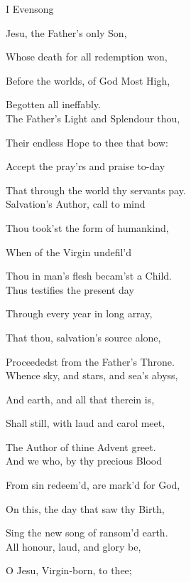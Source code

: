
\begin{paracol}{2}[]
\sloppy
\begin{inhead}
	I Evensong
\end{inhead}
\begin{hangparas}{1.25em}{1}
	
Jesu, the Father's only Son,

Whose death for all redemption won,

Before the worlds, of God Most High,

Begotten all ineffably.\\

The Father's Light and Splendour thou,

Their endless Hope to thee that bow:

Accept the pray'rs and praise to-day

That through the world thy servants pay.\\

Salvation's Author, call to mind

Thou took'st the form of humankind,

When of the Virgin undefil'd

Thou in man's flesh becam'st a Child.\\

Thus testifies the present day

Through every year in long array,

That thou, salvation's source alone,

Proceededst from the Father's Throne.\\

Whence sky, and stars, and sea's abyss,

And earth, and all that therein is,

Shall still, with laud and carol meet,

The Author of thine Advent greet.\\

And we who, by thy precious Blood

From sin redeem'd, are mark'd for God,

On this, the day that saw thy Birth,

Sing the new song of ransom'd earth.\\

All honour, laud, and glory be,

O Jesu, Virgin-born, to thee;


\end{hangparas}
\end{paracol}
